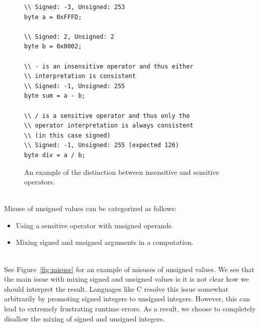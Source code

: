 \begin{figure}
\begin{lstlisting}
\\ Signed: -3, Unsigned: 253
byte a = 0xFFFD;

\\ Signed: 2, Unsigned: 2
byte b = 0x0002;

\\ - is an insensitive operator and thus either
\\ interpretation is consistent
\\ Signed: -1, Unsigned: 255
byte sum = a - b;

\\ / is a sensitive operator and thus only the
\\ operator interpretation is always consistent
\\ (in this case signed)
\\ Signed: -1, Unsigned: 255 (expected 126)
byte div = a / b;
\end{lstlisting}
\caption{An example of the distinction between insensitive and sensitive
operators.}
\label{fig:operators}
\end{figure}

\noindent\\
Misuse of unsigned values can be categorized as follows:

\begin{itemize}
  \item Using a sensitive operator with unsigned operands.
  \item Mixing signed and unsigned arguments in a computation.
\end{itemize}

\noindent\\
See Figure~\ref{fig:misuse} for
an example of misuses of unsigned values. We see that the main issue with
mixing signed and unsigned values is it is not clear how we should interpret the
result. Languages like C resolve this issue somewhat arbitrarily by promoting
signed integers to unsigned integers. However, this can lead to extremely
frustrating runtime errors. As a result, we choose to completely disallow
the mixing of signed and unsigned integers.

